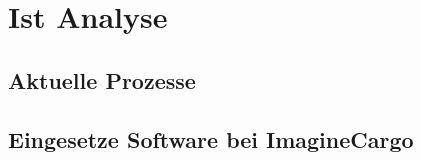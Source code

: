 \chapter{Ist Analyse}
\label{sec:istanalyse}

\section{Aktuelle Prozesse}
\section{Eingesetze Software bei ImagineCargo}